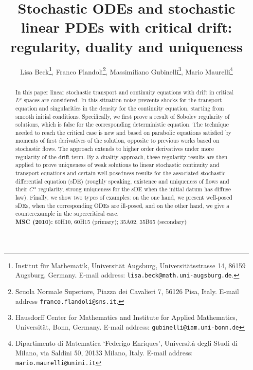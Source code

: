 \documentclass[a4paper,10pt]{article}
\newcommand\1{\mathbbm{1}}
\numberwithin{equation}{section}
\begin{document}
\title{Stochastic ODEs and stochastic linear PDEs with critical drift: regularity, duality and uniqueness}
\author{
  Lisa Beck\footnote{Institut f\"ur Mathematik, Universit\"at Augsburg, Universit\"atsstrasse 14, 86159 Augsburg, Germany. E-mail address: {\tt lisa.beck@math.uni-augsburg.de}.}, 
  Franco Flandoli\footnote{Scuola Normale Superiore, Piazza dei Cavalieri 7, 56126 Pisa, Italy. E-mail address {\tt franco.flandoli@sns.it}.}, 
  Massimiliano Gubinelli\footnote{Hausdorff Center for Mathematics and Institute for Applied Mathematics, Universit\"at, Bonn, Germany. E-mail address: {\tt gubinelli@iam.uni-bonn.de}}, 
  Mario Maurelli\footnote{Dipartimento di Matematica `Federigo Enriques', Universit\`a degli Studi di Milano, via Saldini 50, 20133 Milano, Italy. E-mail address: {\tt mario.maurelli@unimi.it}}}
\date{}
\maketitle

\begin{abstract}
In this paper linear stochastic transport and continuity equations with drift in critical $L^{p}$ spaces are considered. In this situation noise prevents shocks for the transport equation and singularities in the density for the continuity equation, starting from smooth initial conditions. Specifically, we first prove a result of Sobolev regularity of solutions, which is false for the corresponding deterministic equation. The technique needed to reach the critical case is new and based on parabolic equations satisfied by moments of first derivatives of the solution, opposite to previous works based on stochastic flows. The approach extends to higher order derivatives under more regularity of the drift term. By a duality approach, these regularity results are then applied to prove uniqueness of weak solutions to linear stochastic continuity and transport equations and certain well-posedness results for the associated stochastic differential equation (sDE) (roughly speaking, existence and uniqueness of flows and their $C^\alpha$ regularity, strong uniqueness for the sDE when the initial datum has diffuse law). Finally, we show two types of examples: on the one hand, we present well-posed sDEs, when the corresponding ODEs are ill-posed, and on the other hand, we give a counterexample in the supercritical case.
\\[1ex]
{\bf MSC (2010):} 60H10, 60H15 (primary); 35A02, 35B65 (secondary)
\end{abstract}
\end{document}
